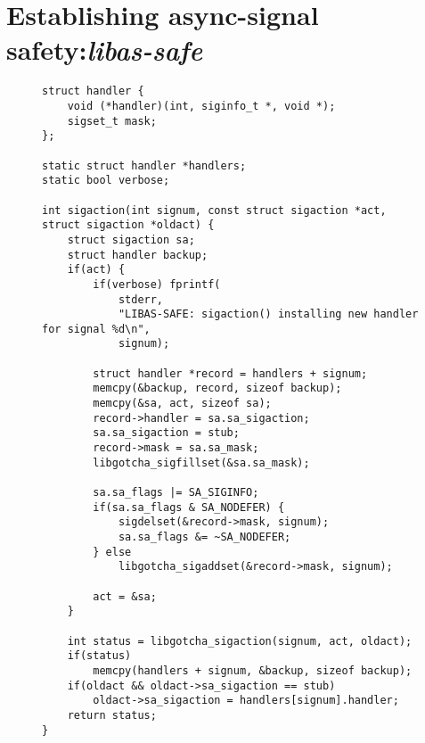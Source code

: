 \section{Establishing async-signal safety:\@ \textit{libas-safe}}

\begin{figure}
\begin{lstlisting}[label=lst:assafe_sigaction,caption=\textit{libas-safe}'s \texttt{sigaction()} replacement]
struct handler {
	void (*handler)(int, siginfo_t *, void *);
	sigset_t mask;
};

static struct handler *handlers;
static bool verbose;

int sigaction(int signum, const struct sigaction *act, struct sigaction *oldact) {
	struct sigaction sa;
	struct handler backup;
	if(act) {
		if(verbose) fprintf(
			stderr,
			"LIBAS-SAFE: sigaction() installing new handler for signal %d\n",
			signum);

		struct handler *record = handlers + signum;
		memcpy(&backup, record, sizeof backup);
		memcpy(&sa, act, sizeof sa);
		record->handler = sa.sa_sigaction;
		sa.sa_sigaction = stub;
		record->mask = sa.sa_mask;
		libgotcha_sigfillset(&sa.sa_mask);

		sa.sa_flags |= SA_SIGINFO;
		if(sa.sa_flags & SA_NODEFER) {
			sigdelset(&record->mask, signum);
			sa.sa_flags &= ~SA_NODEFER;
		} else
			libgotcha_sigaddset(&record->mask, signum);

		act = &sa;
	}

	int status = libgotcha_sigaction(signum, act, oldact);
	if(status)
		memcpy(handlers + signum, &backup, sizeof backup);
	if(oldact && oldact->sa_sigaction == stub)
		oldact->sa_sigaction = handlers[signum].handler;
	return status;
}
\end{lstlisting}
\end{figure}

